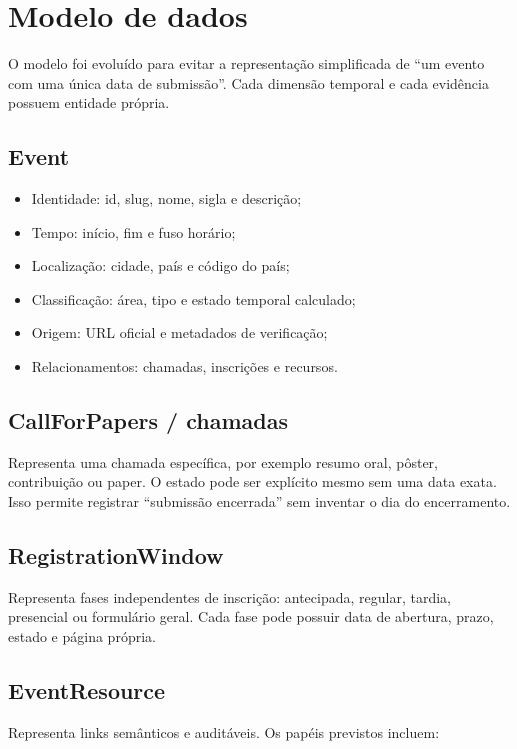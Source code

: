 \chapter{Modelo de dados}

O modelo foi evoluído para evitar a representação simplificada de “um evento com uma única data de submissão”. Cada dimensão temporal e cada evidência possuem entidade própria.

\section{Event}

\begin{itemize}[leftmargin=*,itemsep=0.25em]
\item Identidade: id, slug, nome, sigla e descrição;
\item Tempo: início, fim e fuso horário;
\item Localização: cidade, país e código do país;
\item Classificação: área, tipo e estado temporal calculado;
\item Origem: URL oficial e metadados de verificação;
\item Relacionamentos: chamadas, inscrições e recursos.
\end{itemize}

\section{CallForPapers / chamadas}

Representa uma chamada específica, por exemplo resumo oral, pôster, contribuição ou paper. O estado pode ser explícito mesmo sem uma data exata. Isso permite registrar “submissão encerrada” sem inventar o dia do encerramento.

\section{RegistrationWindow}

Representa fases independentes de inscrição: antecipada, regular, tardia, presencial ou formulário geral. Cada fase pode possuir data de abertura, prazo, estado e página própria.

\section{EventResource}

Representa links semânticos e auditáveis. Os papéis previstos incluem:

